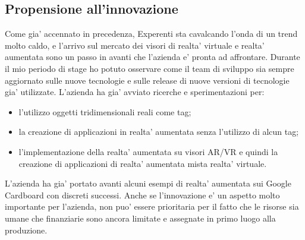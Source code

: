 \subsection{Propensione all'innovazione}
Come gia' accennato in precedenza, Experenti sta cavalcando l'onda di un trend molto caldo, e l'arrivo sul mercato dei visori di realta' virtuale e realta' aumentata sono un passo in avanti che l'azienda e' pronta ad affrontare. Durante il mio periodo di stage ho potuto osservare come il team di sviluppo sia sempre aggiornato sulle nuove tecnologie e sulle release di nuove versioni di tecnologie gia' utilizzate.
L'azienda ha gia' avviato ricerche e sperimentazioni per:
\begin{itemize}
	\item l'utilizzo oggetti tridimensionali reali come tag;
	\item la creazione di applicazioni in realta' aumentata senza l'utilizzo di alcun tag;
	\item l'implementazione della realta' aumentata su visori AR/VR e quindi la creazione di applicazioni di realta' aumentata mista realta' virtuale.
\end{itemize}
L'azienda ha gia' portato avanti alcuni esempi di realta' aumentata sui Google Cardboard con discreti successi.
Anche se l'innovazione e' un aspetto molto importante per l'azienda, non puo' essere prioritaria per il fatto che le risorse sia umane che finanziarie sono ancora limitate e assegnate in primo luogo alla produzione.